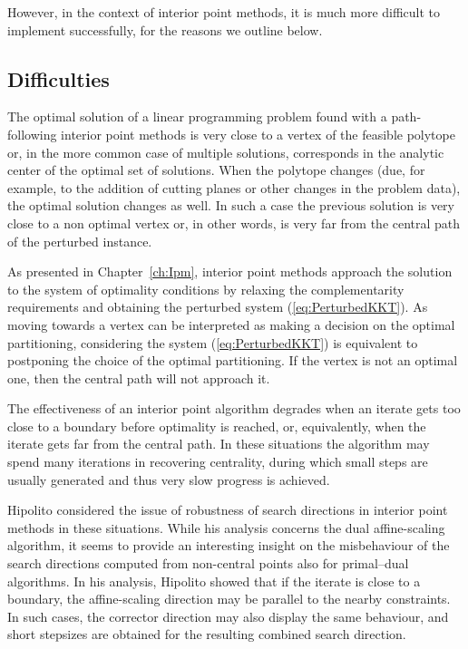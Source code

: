 
However, in the context of interior point methods, it 
is much more difficult to implement successfully, for the reasons
we outline below.

%
%
\subsection{Difficulties}
\label{sec:WarmStartDifficulties}

The optimal solution of a linear programming problem found with 
a path-following interior point methods is very close to a vertex of 
the feasible polytope or, in the more common case of multiple solutions, 
corresponds in the analytic center of the optimal set of solutions.
When the polytope changes (due, for example,
to the addition of cutting planes or other changes in the 
problem data), the optimal solution changes as well.
In such a case the previous solution is very close to a non optimal
vertex or, in other words, is very far from the central path
of the perturbed instance. 

As presented in Chapter~\ref{ch:Ipm}, interior point methods approach 
the solution to the \KKT system of optimality conditions by relaxing 
the complementarity requirements and obtaining the perturbed
system (\ref{eq:PerturbedKKT}).
As moving towards a vertex can be interpreted as making 
a decision on the optimal partitioning, considering the 
system (\ref{eq:PerturbedKKT}) is equivalent to postponing 
the choice of the optimal partitioning.
If the vertex is not an 
optimal one, then the central path will not approach it.

The effectiveness of an interior point algorithm degrades when an 
iterate gets too close to a boundary before optimality is reached,
or, equivalently, when the iterate gets far from the central path.
In these situations the algorithm may spend many iterations in recovering
centrality, during which small steps are usually generated and thus
very slow progress is achieved.

Hipolito \cite{Hipolito} considered the issue of robustness of 
search directions in interior point methods in these situations.
While his analysis concerns the dual affine-scaling algorithm, 
it seems to provide an interesting insight on the misbehaviour
of the search directions computed from non-central points also
for primal--dual algorithms.
In his analysis, Hipolito showed that if the iterate is close 
to a boundary, the affine-scaling direction may be parallel to 
the nearby constraints. In such cases, the corrector direction 
may also display the same behaviour, and short stepsizes are 
obtained for the resulting combined search direction.

